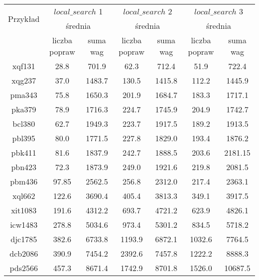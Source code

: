 \documentclass{article}
\begin{document}
\begin{table}[h!]
    \centering
    \begin{tabular}{|c|c|c|c|c|c|c|}
        \hline
        \multirow{2}{*}{Przykład} & \multicolumn{2}{|c|}{$local\_search$ 1} & \multicolumn{2}{|c|}{$local\_search$ 2}  & \multicolumn{2}{|c|}{$local\_search$ 3}  \\
        \cline{2-7}
        & \multicolumn{2}{c|}{średnia} & \multicolumn{2}{c|}{średnia} & \multicolumn{2}{c|}{średnia} \\
        \cline{2-4} \cline{4-5} \cline{6-7}
        & liczba popraw & suma wag & liczba popraw & suma wag & liczba popraw & suma wag \\
        \hline
        xqf131 & 28.8 & 701.9 & 62.3 & 712.4 & 51.9 & 722.4 \\
        \hline
        xqg237 & 37.0 & 1483.7 & 130.5 & 1415.8 & 112.2 & 1445.9 \\
        \hline
        pma343 & 75.8 & 1650.3 & 201.9 & 1684.7 & 183.3 & 1717.1 \\
        \hline
        pka379 & 78.9 & 1716.3 & 224.7 & 1745.9 & 204.9 & 1742.7 \\
        \hline
        bcl380 & 62.7 & 1949.3 & 223.7 & 1917.5 & 189.2 & 1913.5 \\
        \hline
        pbl395 & 80.0 & 1771.5 & 227.8 & 1829.0 & 193.4 & 1876.2 \\
        \hline
        pbk411 & 81.6 & 1837.9 & 242.7 & 1888.5 & 203.6 & 2181.15 \\
        \hline
        pbn423 & 72.3 & 1873.9 & 249.0 & 1921.6 & 219.8 & 2081.5 \\
        \hline
        pbm436 & 97.85 & 2562.5 & 256.8 & 2312.0 & 217.4 & 2363.1 \\
        \hline
        xql662 & 122.6 & 3690.4 & 405.4 & 3813.3 & 349.1 & 3917.5 \\
        \hline
        xit1083 & 191.6 & 4312.2 & 693.7 & 4721.2 & 623.9 & 4826.1 \\
        \hline
        icw1483 & 278.8 & 5034.6 & 973.4 & 5301.2 & 834.5 & 5718.2 \\
        \hline
        djc1785 & 382.6 & 6733.8 & 1193.9 & 6872.1 & 1032.6 & 7764.5 \\
        \hline
        dcb2086 & 390.9 & 7454.2 & 2392.6 & 7457.8 & 1222.2 & 8888.3 \\
        \hline
        pds2566 & 457.3 & 8671.4 & 1742.9 & 8701.8 & 1526.0 & 10687.5 \\
        \hline
    \end{tabular}
\end{table}
\end{document}
